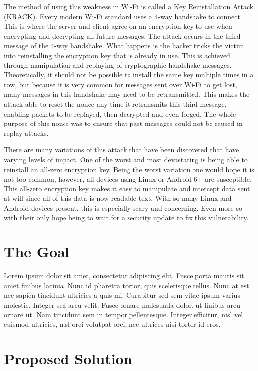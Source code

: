 \documentclass[11pt,]{article}
\begin{document}
The method of using this weakness in Wi-Fi is called a Key
Reinstallation Attack (KRACK). Every modern Wi-Fi standard uses a 4-way
handshake to connect. This is where the server and client agree on an
encryption key to use when encrypting and decrypting all future
messages. The attack occurs in the third message of the 4-way handshake.
What happens is the hacker tricks the victim into reinstalling the
encryption key that is already in use. This is achieved through
manipulation and replaying of cryptographic handshake messages.
Theoretically, it should not be possible to install the same key
multiple times in a row, but because it is very common for messages sent
over Wi-Fi to get lost, many messages in this handshake may need to be
retransmitted. This makes the attack able to reset the nonce any time it
retransmits this third message, enabling packets to be replayed, then
decrypted and even forged. The whole purpose of this nonce was to ensure
that past massages could not be reused in replay attacks.

There are many variations of this attack that have been discovered that
have varying levels of impact. One of the worst and most devastating is
being able to reinstall an all-zero encryption key. Being the worst
variation one would hope it is not too common, however, all devices
using Linux or Android 6+ are susceptible. This all-zero encryption key
makes it easy to manipulate and intercept data sent at will since all of
this data is now readable text. With so many Linux and Android devices
present, this is especially scary and concerning. Even more so with
their only hope being to wait for a security update to fix this
vulnerability.

\section{The Goal}\label{the-goal}

Lorem ipsum dolor sit amet, consectetur adipiscing elit. Fusce porta
mauris sit amet finibus lacinia. Nunc id pharetra tortor, quis
scelerisque tellus. Nunc at est nec sapien tincidunt ultricies a quis
mi. Curabitur sed sem vitae ipsum varius molestie. Integer sed arcu
velit. Fusce ornare malesuada dolor, ut finibus arcu ornare ut. Nam
tincidunt sem in tempor pellentesque. Integer efficitur, nisl vel
euismod ultricies, nisl orci volutpat orci, nec ultrices nisi tortor id
eros.

\section{Proposed Solution}\label{proposed-solution}
\end{document}
